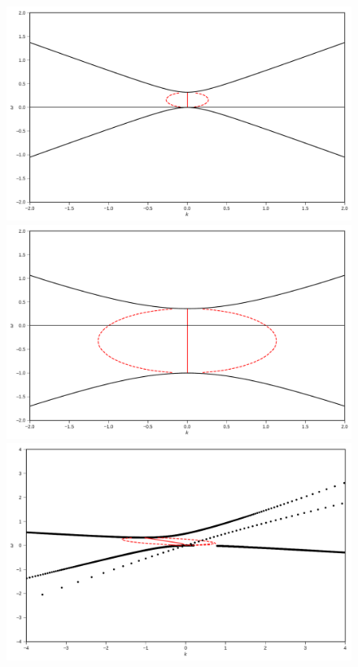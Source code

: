 \documentclass[%
preprint,
 amsmath,amssymb,
 aps,
 prd
]{revtex4-1}
\begin{document}
\begin{figure}[!htb]
  \includegraphics[width=\linewidth]{assets/spectDBWC1DRDBMAAPltBlob.pdf}
\endminipage\hfill
{}
  \includegraphics[width=\linewidth]{assets/spectDBWC1DRDBMZAPltBlob.pdf}
\endminipage\hfill
\newline
{}
  \includegraphics[width=\linewidth]{assets/spectDB3WC4DRDBMAAPltBlob.pdf}

\end{figure}
\end{document}
